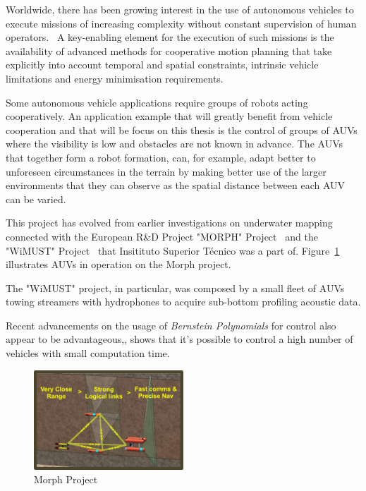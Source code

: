 \par Worldwide, there has been growing interest in the use of autonomous vehicles to execute missions of increasing complexity without constant supervision of human operators.~\cite{xargay2012time} A key-enabling element for the execution of such missions is the availability of advanced methods for cooperative motion planning that take explicitly into account temporal and spatial constraints, intrinsic vehicle limitations and energy minimisation requirements. 
\par Some autonomous vehicle applications require groups of robots acting cooperatively. An application example that will greatly benefit from vehicle cooperation and that will be focus on this thesis is the control of groups of \acp{AUV} where the visibility is low and obstacles are not known in advance. The \acp{AUV} that together form a robot formation, can, for example, adapt better to unforeseen circumstances in the terrain by making better use of the larger environments that they can observe as the spatial distance between each \ac{AUV} can be varied.
\par This project has evolved from earlier investigations on underwater mapping connected with the European R\&D Project "MORPH" Project~\cite{morph,aguiar2009cooperative} and the "WiMUST" Project~\cite{abreu2016widely} that Insitituto Superior Técnico was a part of. Figure~\ref{fig:morph} illustrates \acp{AUV} in operation on the Morph project.
\par The "WiMUST" project, in particular, was composed by a small fleet of \acp{AUV} towing streamers with hydrophones to acquire sub-bottom profiling acoustic data.
\par Recent advancements on the usage of \textit{Bernstein Polynomials} for control also appear to be advantageous,, shows that it's possible to control a high number of vehicles with small computation time.

\begin{figure}[h!]
    \centering
    \includegraphics[width=0.5\textwidth]{Images/projects/Picture2.png}
    \caption{Morph Project}
    \label{fig:morph}
\end{figure}
    
